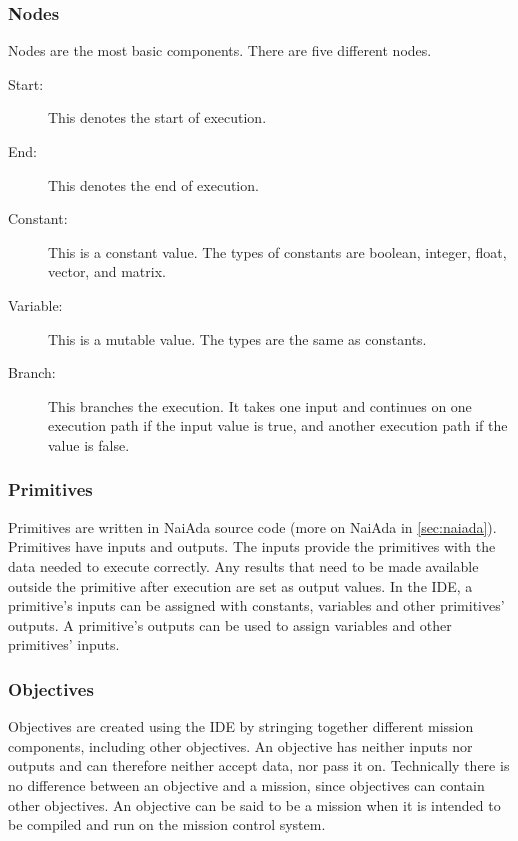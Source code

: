 \subsubsection{Nodes}
Nodes are the most basic components. There are five different nodes.
\begin{description}
\item[Start:] This denotes the start of execution.
\item[End:] This denotes the end of execution.
\item[Constant:] This is a constant value. The types of constants are boolean, integer, float, vector, and matrix.
\item[Variable:] This is a mutable value. The types are the same as constants.
\item[Branch:] This branches the execution. It takes one input and continues on one execution path if the input value is true, and another execution path if the value is false.
\end{description}

\subsubsection{Primitives}
\label{sec:primitives}
Primitives are written in NaiAda source code (more on NaiAda in \cref{sec:naiada}). Primitives have inputs and outputs. The inputs provide the primitives with the data needed to execute correctly. Any results that need to be made available outside the primitive after execution are set as output values. In the IDE, a primitive's inputs can be assigned with constants, variables and other primitives' outputs. A primitive's outputs can be
used to assign variables and other primitives' inputs.

\subsubsection{Objectives}
Objectives are created using the IDE by stringing together different mission components, including other objectives. An objective has neither inputs nor outputs and can therefore neither accept data, nor pass it on. Technically there is no difference between an objective and a mission, since objectives can contain other objectives. An objective can be said to be a mission when it is intended to be compiled and run on the mission control system.
